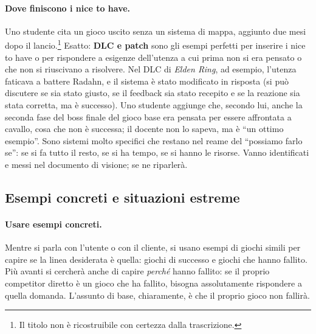 \paragraph{Dove finiscono i nice to have.} Uno studente cita un gioco uscito
senza un sistema di mappa, aggiunto due mesi dopo il
lancio.\footnote{Il titolo non è ricostruibile con certezza dalla
trascrizione.} Esatto: \textbf{DLC e patch} sono gli esempi perfetti per
inserire i nice to have o per rispondere a esigenze dell'utenza a cui prima
non si era pensato o che non si riuscivano a risolvere. Nel DLC di \emph{Elden
Ring}, ad esempio, l'utenza faticava a battere Radahn, e il sistema è stato
modificato in risposta (si può discutere se sia stato giusto, se il feedback
sia stato recepito e se la reazione sia stata corretta, ma è successo). Uno
studente aggiunge che, secondo lui, anche la seconda fase del boss finale del
gioco base era pensata per essere affrontata a cavallo, cosa che non è
successa; il docente non lo sapeva, ma è ``un ottimo esempio''. Sono sistemi
molto specifici che restano nel reame del ``possiamo farlo se'': se si fa
tutto il resto, se si ha tempo, se si hanno le risorse. Vanno identificati e
messi nel documento di visione; se ne riparlerà.

\subsection{Esempi concreti e situazioni estreme}

\paragraph{Usare esempi concreti.} Mentre si parla con l'utente o con il
cliente, si usano esempi di giochi simili per capire se la linea desiderata è
quella: giochi di successo e giochi che hanno fallito. Più avanti si cercherà
anche di capire \emph{perché} hanno fallito: se il proprio competitor diretto
è un gioco che ha fallito, bisogna assolutamente rispondere a quella domanda.
L'assunto di base, chiaramente, è che il proprio gioco non fallirà.

